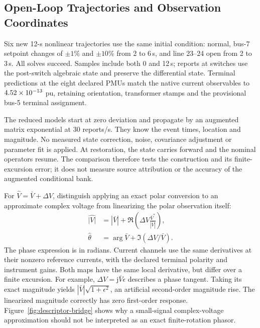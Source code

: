 \subsection{Open-Loop Trajectories and Observation Coordinates}
Six new 12-s nonlinear trajectories use the same initial condition:
normal, bus-7 setpoint changes of $\pm1\%$ and $\pm10\%$ from 2 to 6\,s,
and line 23--24 open from 2 to 3\,s. All solves succeed. Samples include
both 0 and 12\,s; reports at switches use the post-switch algebraic state
and preserve the differential state. Terminal predictions at the eight
declared PMUs match the native current observables to
$4.52\times10^{-13}{}$ pu, retaining orientation, transformer stamps
and the provisional bus-5 terminal assignment.

The reduced models start at zero deviation and propagate by an augmented
matrix exponential at 30 reports/s. They know the event times, location
and magnitude. No measured state correction, noise, covariance adjustment
or parameter fit is applied. At restoration, the state carries forward
and the nominal operators resume. The comparison therefore tests the
construction and its finite-excursion error; it does not measure source
attribution or the accuracy of the augmented conditional bank.



For $\hat V=\bar V+\Delta V$, distinguish applying an exact polar
conversion to an approximate complex voltage from linearizing the polar
observation itself:
\begin{align}
 \widehat{|V|}&=|\bar V|+
 \Re\!\left(\Delta V\frac{\bar V^*}{|\bar V|}\right),\nonumber\\
 \hat\theta&=\arg\bar V+\Im(\Delta V/\bar V).
 \label{eq:bridge-polar}
\end{align}
The phase expression is in radians. Current channels use the same
derivatives at their nonzero reference currents, with the declared
terminal polarity and instrument gains. Both maps have the same local
derivative, but differ over a finite excursion. For example,
$\Delta V=\mathrm j\bar V\epsilon$ describes a phase tangent.
Taking its exact magnitude yields $|\bar V|\sqrt{1+\epsilon^2}$,
an artificial second-order magnitude rise. The linearized magnitude
correctly has zero first-order response. Figure~\ref{fig:descriptor-bridge}
shows why a small-signal complex-voltage approximation should not be
interpreted as an exact finite-rotation phasor.


